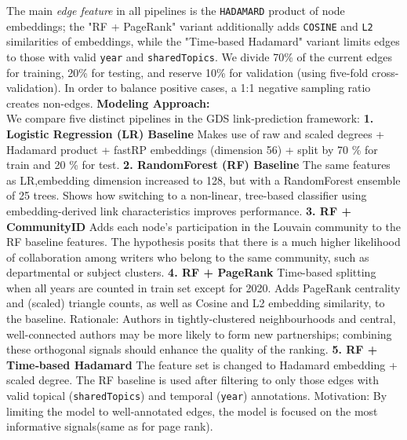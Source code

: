 \documentclass[conference]{IEEEtran}
\begin{document}
The main \emph{edge feature} in all pipelines is the \texttt{HADAMARD} product of node embeddings; the "RF + PageRank" variant additionally adds \texttt{COSINE} and \texttt{L2} similarities of embeddings, while the "Time‐based Hadamard" variant limits edges to those with valid \texttt{year} and \texttt{sharedTopics}.  We divide 70\% of the current edges for training, 20\% for testing, and reserve 10\% for validation (using five-fold cross-validation).  In order to balance positive cases, a 1:1 negative sampling ratio creates non-edges.
\newline \newline
\noindent\textbf{Modeling Approach:}\\
We compare five distinct pipelines in the GDS link‐prediction framework:
\newline \newline
\noindent \textbf{1. Logistic Regression (LR) Baseline \newline} 
Makes use of raw and scaled degrees + Hadamard product + fastRP embeddings (dimension 56) + split by 70 \% for train and 20 \% for test.
\newline \newline
\noindent \textbf{2. RandomForest (RF) Baseline \newline}  
The same features as LR,embedding dimension increased to 128, but with a RandomForest ensemble of 25 trees.  
Shows how switching to a non-linear, tree-based classifier using embedding-derived link characteristics improves performance.
\newline \newline
\noindent \textbf{3. RF + CommunityID \newline}  
Adds each node's participation in the Louvain community to the RF baseline features.  
 The hypothesis posits that there is a much higher likelihood of collaboration among writers who belong to the same community, such as departmental or subject clusters.
\newline \newline
\noindent \textbf{4. RF + PageRank \newline} 
Time-based splitting when all years are counted in train set except for 2020.
Adds PageRank centrality and (scaled) triangle counts, as well as Cosine and L2 embedding similarity, to the baseline.  
 Rationale: Authors in tightly-clustered neighbourhoods and central, well-connected authors may be more likely to form new partnerships; combining these orthogonal signals should enhance the quality of the ranking.
\newline \newline
\noindent \textbf{5. RF + Time‐based Hadamard \newline} 
The feature set is changed to Hadamard embedding + scaled degree. The RF baseline is used after filtering to only those edges with valid topical (\texttt{sharedTopics}) and temporal (\texttt{year}) annotations.  
 Motivation: By limiting the model to well-annotated edges, the model is focused on the most informative signals(same as for page rank).
\end{document}
